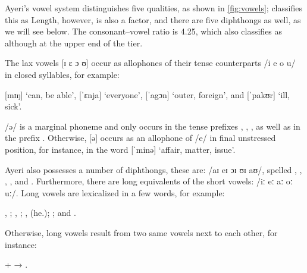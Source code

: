 Ayeri's vowel system distinguishes five qualities, as shown in 
\autoref{fig:vowels}; \citet{wals2} classifies this as 
Length, however, is also a factor, and there are five diphthongs as well, as we 
will see below. The consonant--vowel ratio is 4.25, which \citet{wals3} also 
classifies as  although at the upper end of the tier.

The lax vowels [ɪ ɛ ɔ ʊ] occur as allophones of their tense counterparts 
/i e o u/ in closed syllables, for example:

\pex
	\a {} [mɪŋ] `can, be able',
	\a {} [ˈɛnja] `everyone',
	\a {} [ˈagɔn] `outer, foreign', and
	\a {} [ˈpakʊr] `ill, sick'.
\xe

/ə/ is a marginal phoneme and only occurs in the tense prefixes 
, , , as 
well as in the prefix . Otherwise, [ə] occurs 
as an allophone of /e/ in final unstressed position, for instance, in the word 
 [ˈminə] `affair, matter, issue'.

Ayeri also possesses a number of diphthongs, these are: /aɪ eɪ ɔɪ ʊɪ aʊ/, 
spelled , , , , and .
Furthermore, there are long equivalents of the short vowels: /iː eː aː oː uː/. 
Long vowels are lexicalized in a few words, for example:

\pex
	\a {}, ;
	\a {}, ;
	\a {},  (he.\Aarg{}); \label{ex:laa}
	\a {}; and 
	\a {}.\footnotemark
\xe


\noindent Otherwise, long vowels result from two same vowels next to each other, 
for instance:

\ex
	 +  → 
	.\label{ex:longvwls}
\xe

